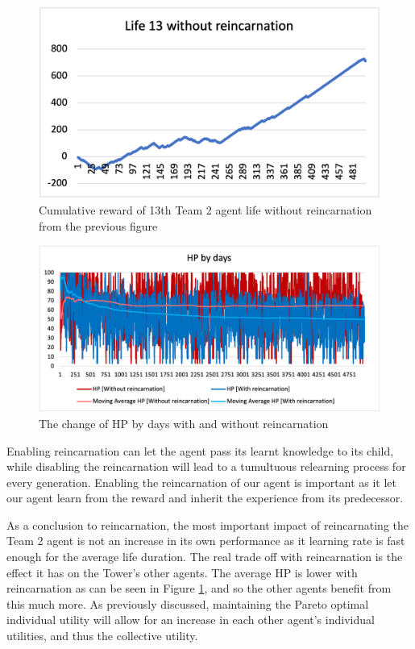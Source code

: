 \begin{figure}
\centering
\includegraphics{004_team_2_agent_design/cum13team2}
\caption{Cumulative reward of 13th Team 2 agent life without reincarnation from the previous figure}
\end{figure}

\begin{figure}
\centering
\includegraphics{004_team_2_agent_design/hpdaysteam2}
\caption{The change of HP by days with and without reincarnation}
\label{hpdaysteam2}
\end{figure}

Enabling reincarnation can let the agent pass its learnt knowledge to its child, while disabling the reincarnation will lead to a tumultuous relearning process for every generation. Enabling the reincarnation of our agent is important as it let our agent learn from the reward and inherit the experience from its predecessor. 

As a conclusion to reincarnation, the most important impact of reincarnating the Team 2 agent is not an increase in its own performance as it learning rate is fast enough for the average life duration. The real trade off with reincarnation is the effect it has on the Tower’s other agents. The average HP is lower with reincarnation as can be seen in Figure \ref{hpdaysteam2}, and so the other agents benefit from this much more. As previously discussed, maintaining the Pareto optimal individual utility will allow for an increase in each other agent’s individual utilities, and thus the collective utility.

